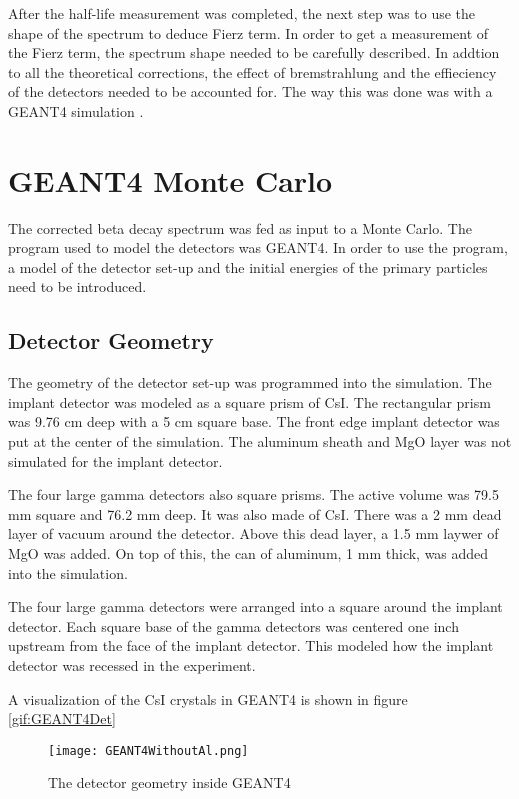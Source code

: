 

After the half-life measurement was completed, the next step was to use the shape of the spectrum to deduce Fierz term. 
In order to get a measurement of the Fierz term, the spectrum shape needed to be carefully described.
In addtion to all the theoretical corrections, the effect of bremstrahlung and the effieciency of the detectors needed to be accounted for.
The way this was done was with a GEANT4 simulation \cite{Ago03}.

\section{GEANT4 Monte Carlo}
The corrected beta decay spectrum was fed as input to a Monte Carlo.
The program used to model the detectors was GEANT4.
In order to use the program, a model of the detector set-up and the initial energies of the primary particles need to be introduced.  

\subsection{Detector Geometry}
The geometry of the detector set-up was programmed into the simulation.
The implant detector was modeled as a square prism of CsI.
The rectangular prism was 9.76 cm deep with a 5 cm square base.
The front edge implant detector was put at the center of the simulation.
The aluminum sheath and MgO layer was not simulated for the implant detector.

The four large gamma detectors also square prisms.
The active volume was 79.5 mm square and 76.2 mm deep.
It was also made of CsI.
There was a 2 mm dead layer of vacuum around the detector.
Above this dead layer, a 1.5 mm laywer of MgO was added.
On top of this, the can of aluminum, 1 mm thick, was added into the simulation.

The four large gamma detectors were arranged into a square around the implant detector.
Each square base of the gamma detectors was centered one inch upstream from the face of the implant detector.
This modeled how the implant detector was recessed in the experiment.

A visualization of the CsI crystals in GEANT4 is shown in figure \ref{gif:GEANT4Det}

\begin{figure}[!htb]
	\centerline{\texttt{[image: GEANT4WithoutAl.png]}}
	\caption{The detector geometry inside GEANT4}
	\label{fig:GEANT4Det}
\end{figure}

